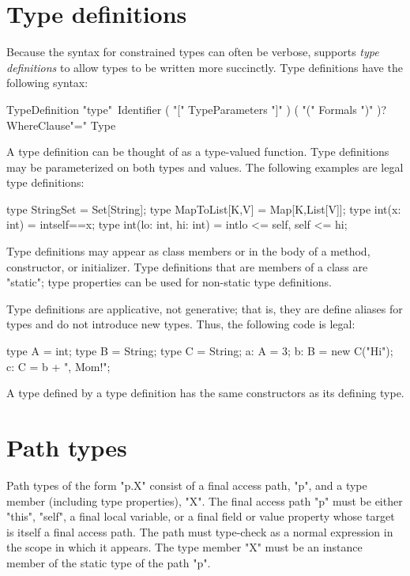 \section{Type definitions}

Because
the syntax for constrained types can often be verbose,
\Xten{} supports {\em type definitions}
to allow types to be written more succinctly.
Type definitions have the following syntax:

\begin{grammar}
TypeDefinition \: 
                \xcd"type"~Identifier
                        ( \xcd"[" TypeParameters \xcd"]" )\opt
                        ( \xcd"(" Formals \xcd")" )\opt?
                        WhereClause\opt \xcd"=" Type \\
\end{grammar}

\noindent
A type definition can be thought of as a type-valued function.
Type definitions may be parameterized on both types and values.
%
The following examples are legal type definitions:
\begin{xten}
type StringSet = Set[String];
type MapToList[K,V] = Map[K,List[V]];
type int(x: int) = int{self==x};
type int(lo: int, hi: int) = int{lo <= self, self <= hi};
\end{xten}

Type definitions may appear as class members or in the body of a
method, constructor, or initializer.  Type definitions that are
members of a class are \xcd"static"; type properties can be used
for non-static type definitions.

Type definitions are applicative, not generative; that is, they
are define aliases for types and do not introduce new types.
Thus, the following code is legal:
\begin{xten}
type A = int;
type B = String;
type C = String;
a: A = 3;
b: B = new C("Hi");
c: C = b + ", Mom!";
\end{xten}
A type defined by a type definition
has the same constructors as its defining type.

\section{Path types}

Path types of the form \xcd"p.X" consist of a final access path,
\xcd"p", and a type
member (including type properties), \xcd"X".
The final access path \xcd"p" must be either \xcd"this", \xcd"self", a final
local variable, or a final field or value property whose target
is itself a final access path.  The path must type-check 
as a normal expression in the scope in which it appears.
The type member
\xcd"X" must be an instance member of the static type of the
path \xcd"p".

